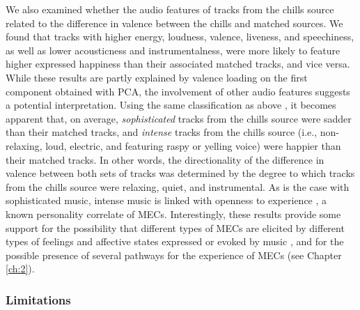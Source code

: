 We also examined whether the audio features of tracks from the chills source related to the difference in valence between the chills and matched sources. We found that tracks with higher energy, loudness, valence, liveness, and speechiness, as well as lower acousticness and instrumentalness, were more likely to feature higher expressed happiness than their associated matched tracks, and vice versa. While these results are partly explained by valence loading on the first component obtained with PCA, the involvement of other audio features suggests a potential interpretation. Using the same classification as above \parencite{rentfrow2012}, it becomes apparent that, on average, \emph{sophisticated} tracks from the chills source were sadder than their matched tracks, and \emph{intense} tracks from the chills source (i.e., non-relaxing, loud, electric, and featuring raspy or yelling voice) were happier than their matched tracks. In other words, the directionality of the difference in valence between both sets of tracks was determined by the degree to which tracks from the chills source were relaxing, quiet, and instrumental. As is the case with sophisticated music, intense music is linked with openness to experience \parencite{schafer2017}, a known personality correlate of MECs. Interestingly, these results provide some support for the possibility that different types of MECs are elicited by different types of feelings and affective states expressed or evoked by music \parencite{bannister2019, maruskin2012}, and for the possible presence of several pathways for the experience of MECs (see Chapter \ref{ch:2}).

\subsubsection{Limitations}

